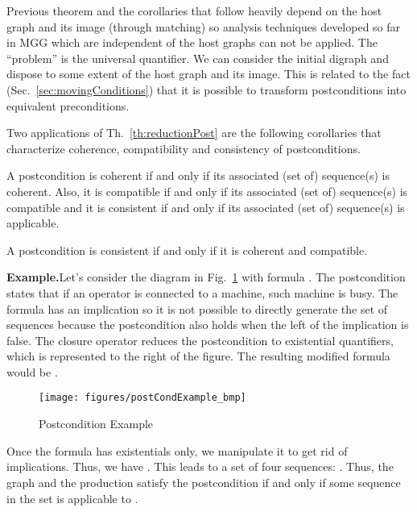 \documentclass{fundam}
\newcommand{\proofend}{\hfill}
\begin{document}
Previous theorem and the corollaries that follow heavily depend on the
host graph and its image (through matching) so analysis techniques
developed so far in MGG which are independent of the host graphs can
not be applied. The ``problem'' is the universal quantifier. We can
consider the initial digraph and dispose to some extent of the host
graph and its image. This is related to the fact
(Sec.~\ref{sec:movingConditions}) that it is possible to transform
postconditions into equivalent preconditions.

Two applications of Th.~\ref{th:reductionPost} are the
following corollaries that characterize coherence, compatibility and
consistency of postconditions.

\begin{corollary}
  \label{cor:equivPostAC_seqs}
  A postcondition is coherent if and only if its associated (set of)
  sequence(s) is coherent.  Also, it is compatible if and only if its
  associated (set of) sequence(s) is compatible and it is consistent
  if and only if its associated (set of) sequence(s) is applicable.
\end{corollary}



\begin{corollary}
  \label{cor:postcondConsCohComp}
  A postcondition is consistent if and only if it is coherent and
  compatible.
\end{corollary}





\noindent \textbf{Example.}Let's consider the diagram in
Fig.~\ref{fig:final_example_GC} with formula . The postcondition states that if an operator
is connected to a machine, such machine is busy. The formula has an
implication so it is not possible to directly generate the set of
sequences because the postcondition also holds when the left of the
implication is false. The closure operator  reduces the
postcondition to existential quantifiers, which is represented to the
right of the figure. The resulting modified formula would be  .

\begin{figure}[htbp]
  \centering
  \texttt{[image: figures/postCondExample\_bmp]}
  \caption{Postcondition Example}
  \label{fig:final_example_GC}
\end{figure}

Once the formula has existentials only, we manipulate it to get rid of
implications. Thus, we have . This leads to a
set of four sequences:
. Thus, the graph
 and the production satisfy the postcondition if and only if some
sequence in the set is applicable to . \proofend
\end{document}
